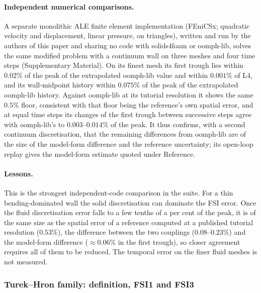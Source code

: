 \paragraph{Independent numerical comparisons.}
A separate monolithic ALE finite element implementation (FEniCSx; quadratic velocity and displacement, linear pressure, on triangles), written and run by the authors of this paper and sharing no code with solids4foam or oomph-lib, solves the same modified problem with a continuum wall on three meshes and four time steps (Supplementary Material).
On its finest mesh its first trough lies within $0.02\%$ of the peak of the extrapolated oomph-lib value and within $0.001\%$ of L4, and its wall-midpoint history within $0.075\%$ of the peak of the extrapolated oomph-lib history.
Against oomph-lib at its tutorial resolution it shows the same $0.5\%$ floor, consistent with that floor being the reference's own spatial error, and at equal time steps its changes of the first trough between successive steps agree with oomph-lib's to $0.003$--$0.014\%$ of the peak.
It thus confirms, with a second continuum discretisation, that the remaining differences from oomph-lib are of the size of the model-form difference and the reference uncertainty; its open-loop replay gives the model-form estimate quoted under Reference.

\paragraph{Lessons.}
This is the strongest independent-code comparison in the suite.
For a thin bending-dominated wall the solid discretisation can dominate the FSI error.
Once the fluid discretisation error falls to a few tenths of a per cent of the peak, it is of the same size as the spatial error of a reference computed at a published tutorial resolution ($0.53\%$), the difference between the two couplings ($0.08$--$0.23\%$) and the model-form difference ($\approx0.06\%$ in the first trough), so closer agreement requires all of them to be reduced.
The temporal error on the finer fluid meshes is not measured.


\subsubsection{Turek--Hron family: definition, FSI1 and FSI3}\label{sec:fsi1}\label{sec:fsi23}

